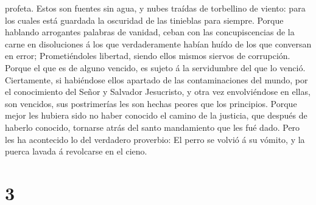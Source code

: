 profeta.  Estos son fuentes sin agua, y nubes traídas de
torbellino de viento: para los cuales está guardada la oscuridad de las
tinieblas para siempre.  Porque hablando arrogantes
palabras de vanidad, ceban con las concupiscencias de la carne en
disoluciones á los que verdaderamente habían huído de los que conversan
en error;  Prometiéndoles libertad, siendo ellos mismos
siervos de corrupción. Porque el que es de alguno vencido, es sujeto á
la servidumbre del que lo venció.  Ciertamente, si
habiéndose ellos apartado de las contaminaciones del mundo, por el
conocimiento del Señor y Salvador Jesucristo, y otra vez envolviéndose
en ellas, son vencidos, sus postrimerías les son hechas peores que los
principios.  Porque mejor les hubiera sido no haber
conocido el camino de la justicia, que después de haberlo conocido,
tornarse atrás del santo mandamiento que les fué dado. 
Pero les ha acontecido lo del verdadero proverbio: El perro se volvió á
su vómito, y la puerca lavada á revolcarse en el cieno.

\hypertarget{section-2}{%
\section{3}\label{section-2}}

